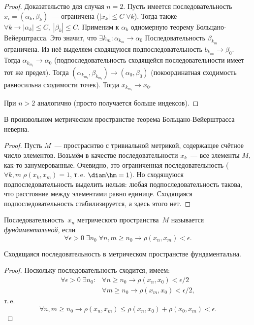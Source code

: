 \begin{proof}
Доказательство для случая \(n = 2\). Пусть имеется последовательность \(x_i = (\alpha_k,
\beta_k)\)~--- ограничена (\(|x_k| \leq C \; \forall k\)). Тогда также \(\forall k \rightarrow
|\alpha_k| \leq C, \; |\beta_k| \leq C\). Применим к \(\alpha_k\) одномерную теорему
Больцано-Вейерштрасса. Это значит, что \(\exists k_m \colon \alpha_{k_m} \rightarrow \alpha_0\)
Последовательность \(\beta_{k_m}\) ограничена. Из неё выделяем сходящуюся подпоследовательность
\(b_{k_{m_l}} \rightarrow \beta_0\). Тогда \(\alpha_{k_{m_l}} \rightarrow \alpha_0\)
(подпоследовательность сходящейся последовательности имеет тот же предел). Тогда \((\alpha_{k_{m_l}},
\beta_{k_{m_l}}) \rightarrow (\alpha_0, \beta_0)\) (покоординатная сходимость равносильна сходимости
точек). Тогда \(x_{k_{m_l}} \rightarrow x_0\).

При \(n > 2\) аналогично (просто получается больше индексов).
\end{proof}

В произвольном метрическом пространстве теорема Больцано-Вейерштрасса неверна.

\begin{proof}
Пусть \(M\)~--- простраснтво с тривиальной метрикой, содержащее счётное число элементов. Возьмём в
качестве последовательности \(x_k\)~--- все элементы \(M\), как-то занумерованные. Очевидно, это
ограниченная последовательность (\(\forall k, m \; \rho(x_k, x_m) = 1\), т.\,e. \(\diam \hm = 1\)).
Но сходящуюся подпоследовательность выделить нельзя: любая подпоследовательность такова, что
расстояние между элементами равно единице. Сходящаяся подпоследовательность стабилизируется, а здесь
этого нет.
\end{proof}

\begin{definition}
Последовательность~\(x_n\) метрического пространства~\(M\) называется \textit{фундаментальной}, если
\[
    \forall \epsilon > 0 \; \exists n_0 \; \forall n, m \geq n_0 \rightarrow \rho(x_n, x_m) <
        \epsilon.
\]
\end{definition}

\begin{statement}
Сходящаяся последовательность в метрическом пространстве фундаментальна.
\end{statement}

\begin{proof}
Поскольку последовательность сходится, имеем:
\begin{align}
    \forall \epsilon > 0 \;\exists n_0 \colon &\forall n \geq n_0 \rightarrow \rho(x_n, x_0) <
        \epsilon / 2\\
    &\forall m \geq n_0 \rightarrow \rho(x_m, x_0) < \epsilon / 2,
\end{align}
т.\,e.
\[
    \forall n, m \geq n_0 \rightarrow \rho(x_n, x_m) \leq \rho(x_n, x_0) + \rho(x_0, x_m) <
        \epsilon.
\]
\end{proof}

